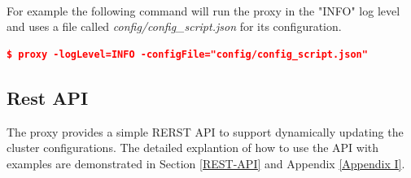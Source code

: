 \documentclass[a4paper,11pt,twoside]{report}
\begin{document}
\begin{appendices}
\noindent\\
For example the following command will run the proxy in the "INFO" log level and uses a file called \textit{config/config\_script.json} for its configuration. 

\begin{lstlisting}[language=json]
$ proxy -logLevel=INFO -configFile="config/config_script.json" 
\end{lstlisting}


\subsection*{Rest API}
The proxy provides a simple RERST API to support dynamically updating the cluster configurations. The detailed explantion of how to use the API with examples are demonstrated in Section \ref{REST-API} and Appendix \ref{Appendix I}.


\end{appendices}

\clearpage
\end{document}
